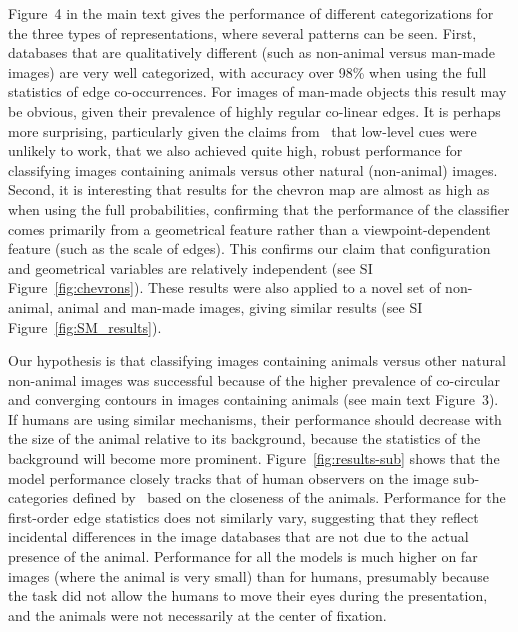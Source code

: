 \documentclass[a4paper]{article}
\begin{document}
Figure~4 in the main text gives the performance of different categorizations 
for the three types of representations, where several patterns can be seen. 
First, databases that are qualitatively different (such as non-animal versus man-made images) 
are very well categorized, with accuracy over 98\% when using the full statistics of edge co-occurrences. 
For images of man-made objects this result may be obvious, 
given their prevalence of highly regular co-linear edges. 
It is perhaps more surprising, particularly given the claims from~\textcite{Serre07} 
that low-level cues were unlikely to work, that we also achieved 
quite high, robust performance for classifying images containing animals versus other natural (non-animal) images.  
Second, it is interesting that results for the chevron map are almost as high 
as when using the full probabilities, 
confirming that the performance of the classifier comes primarily from a geometrical feature 
rather than a viewpoint-dependent feature (such as the scale of edges). 
This confirms our claim that configuration and geometrical variables are relatively independent 
(see SI Figure~\ref{fig:chevrons}).  
These results were also applied to a novel set of non-animal, animal and man-made images, giving similar results (see SI Figure~\ref{fig:SM_results}).

Our hypothesis is that classifying images containing animals versus
other natural non-animal images was successful because of the higher
prevalence of co-circular and converging contours in images containing
animals (see main text Figure~3). %
If humans are using similar mechanisms, their performance should
decrease with the size of the animal relative to its background,
because the statistics of the background will become more prominent.
Figure~\ref{fig:results-sub} shows that the model performance closely
tracks that of human observers on the image sub-categories defined
by~\textcite{Serre07} based on the closeness of the animals.
Performance for the first-order edge statistics does not similarly
vary, suggesting that they reflect incidental differences in the image
databases that are not due to the actual presence of the animal.
Performance for all the models is much higher on far images (where the
animal is very small) than for humans, presumably because the task did
not allow the humans to move their eyes during the presentation, and
the animals were not necessarily at the center of fixation.
\end{document}
